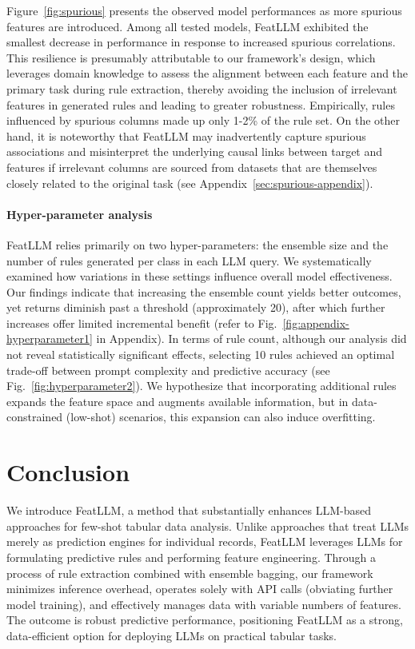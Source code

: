 Figure~\ref{fig:spurious} presents the observed model performances as more spurious features are introduced. Among all tested models, \textsf{FeatLLM} exhibited the smallest decrease in performance in response to increased spurious correlations. This resilience is presumably attributable to our framework’s design, which leverages domain knowledge to assess the alignment between each feature and the primary task during rule extraction, thereby avoiding the inclusion of irrelevant features in generated rules and leading to greater robustness. Empirically, rules influenced by spurious columns made up only 1-2\% of the rule set. On the other hand, it is noteworthy that \textsf{FeatLLM} may inadvertently capture spurious associations and misinterpret the underlying causal links between target and features if irrelevant columns are sourced from datasets that are themselves closely related to the original task (see Appendix~\ref{sec:spurious-appendix}).

\vspace*{-0.12in}
\paragraph{Hyper-parameter analysis}
\textsf{FeatLLM} relies primarily on two hyper-parameters: the ensemble size and the number of rules generated per class in each LLM query. We systematically examined how variations in these settings influence overall model effectiveness. Our findings indicate that increasing the ensemble count yields better outcomes, yet returns diminish past a threshold (approximately 20), after which further increases offer limited incremental benefit (refer to Fig.~\ref{fig:appendix-hyperparameter1} in Appendix). In terms of rule count, although our analysis did not reveal statistically significant effects, selecting 10 rules achieved an optimal trade-off between prompt complexity and predictive accuracy (see Fig.~\ref{fig:hyperparameter2}). We hypothesize that incorporating additional rules expands the feature space and augments available information, but in data-constrained (low-shot) scenarios, this expansion can also induce overfitting.

\section{Conclusion}
We introduce \textsf{FeatLLM}, a method that substantially enhances LLM-based approaches for few-shot tabular data analysis. Unlike approaches that treat LLMs merely as prediction engines for individual records, \textsf{FeatLLM} leverages LLMs for formulating predictive rules and performing feature engineering. Through a process of rule extraction combined with ensemble bagging, our framework minimizes inference overhead, operates solely with API calls (obviating further model training), and effectively manages data with variable numbers of features. The outcome is robust predictive performance, positioning \textsf{FeatLLM} as a strong, data-efficient option for deploying LLMs on practical tabular tasks.

